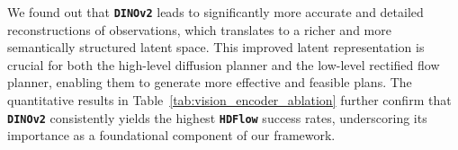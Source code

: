\documentclass{article} %
\begin{document}
\begin{table*}[h]
    \centering
    \caption{\small Ablation study on the choice of vision encoder for the world model. This table reports \texttt{\textbf{HDFlow}} success rates (\%) on all tasks with respective randomization levels.}
    \label{tab:vision_encoder_ablation}
\end{table*}

We found out that \texttt{\textbf{DINOv2}} leads to significantly more accurate and detailed reconstructions of observations, which translates to a richer and more semantically structured latent space. This improved latent representation is crucial for both the high-level diffusion planner and the low-level rectified flow planner, enabling them to generate more effective and feasible plans. The quantitative results in Table~\ref{tab:vision_encoder_ablation} further confirm that \texttt{\textbf{DINOv2}} consistently yields the highest \texttt{\textbf{HDFlow}} success rates, underscoring its importance as a foundational component of our framework.
\end{document}
